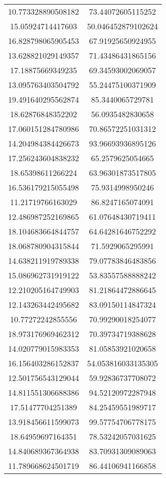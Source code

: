 \begin{table}
\begin{tabular}{cc}
10.773328890508182 & 73.44072605115252 \\
15.05924714417603 & 50.046452879102624 \\
16.828798065905453 & 67.91925650924955 \\
13.628821029149357 & 71.43486431865156 \\
17.18875669349235 & 69.34593002069057 \\
13.095763403504792 & 55.24475100371909 \\
19.491640295562874 & 85.3440065729781 \\
18.62876848352202 & 56.0935482830658 \\
17.060151284780986 & 70.86572251031312 \\
14.204984384426673 & 93.96693936895126 \\
17.256243604838232 & 65.2579625054665 \\
18.65398611266224 & 63.96301873517805 \\
16.536179215055498 & 75.9314998950246 \\
11.21719766163029 & 86.8247165074091 \\
12.486987252169865 & 61.07648430719411 \\
18.104683664844757 & 64.64281646752292 \\
18.068780904315844 & 71.5929065295991 \\
14.638211919789338 & 79.07783846483856 \\
15.086962731919122 & 53.83557588888242 \\
12.210205164749903 & 81.21864472886645 \\
12.143263442495682 & 83.09150114847324 \\
10.77272242855556 & 70.99290018254077 \\
18.973176969462312 & 70.39734719388628 \\
14.020779015983353 & 81.05853921020658 \\
16.156403286152837 & 54.053816033135305 \\
12.501756543129044 & 59.92836737708072 \\
14.811551306688386 & 94.52120972287948 \\
17.51477704251389 & 84.25459551989717 \\
13.918456611599073 & 99.57754706778175 \\
18.64959697164351 & 78.53242057031625 \\
14.840689367364938 & 83.70931309089063 \\
11.789668624501719 & 86.44106941166858 \\

\end{tabular}
\end{table}
